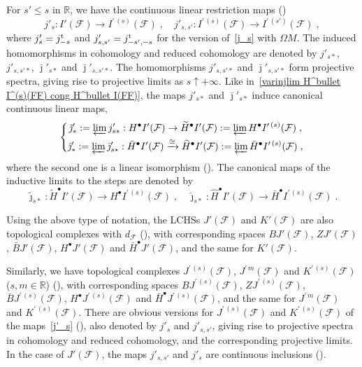 \documentclass{memo-l}
\theoremstyle{plain}
\theoremstyle{definition}
\theoremstyle{remark}
\newcommand{\R}{\mathbb{R}}
\newcommand{\FF}{\mathcal{F}}
\newcommand{\trans}{{\text{\rm t}}}
\numberwithin{section}{chapter}
\numberwithin{equation}{section}%
\begin{document}
For $s'\le s$ in $\R$, we have the continuous linear restriction maps ()
\begin{equation}\label{j'_s}
j'_s:I'(\FF)\to I^{\prime\,(s)}(\FF)\;,\quad j'_{s,s'}:I^{\prime\,(s)}(\FF)\to I^{\prime\,(s')}(\FF)\;,
\end{equation}
where $j'_s=j_{-s}^\trans$ and $j'_{s,s'}=j_{-s',-s}^\trans$ for the version of~\eqref{j_s} with $\Omega M$. The induced homomorphisms in cohomology and reduced cohomology are denoted by  $j'_{s*}$, $j'_{s,s'*}$, $\bar\jmath'_{s*}$ and $\bar\jmath'_{s,s'*}$. The homomorphisms $j'_{s,s'*}$ and $\bar\jmath'_{s,s'*}$ form projective spectra, giving rise to projective limits as $s\uparrow+\infty$. Like in~\eqref{varinjlim H^bullet I^(s)(FF) cong H^bullet I(FF)}, the maps $j'_{s*}$ and $\bar\jmath'_{s*}$ induce canonical continuous linear maps,
\begin{equation}\label{bar H^bullet I'(FF) cong projlim bar H^bullet I^(prime s)(FF)}
\left\{
\begin{gathered}
\tilde\jmath'_*:=\varprojlim j'_{s*}:H^\bullet I'(\FF)\to\widetilde H^\bullet I'(\FF)
:=\varprojlim H^\bullet I^{\prime\,(s)}(\FF)\;,\\
\hat\jmath'_*:=\varprojlim\bar\jmath'_{s*}:\bar H^\bullet I'(\FF)\xrightarrow{\cong}
\widehat H^\bullet I'(\FF):=\varprojlim\bar H^\bullet I^{\prime\,(s)}(\FF)\;,
\end{gathered}
\right.
\end{equation}
where the second one is a linear isomorphism (). The canonical maps of the inductive limits to the steps are denoted by  
\[
\tilde\jmath_{s*}:\widetilde H^\bullet I'(\FF)\to H^\bullet I^{\prime\,(s)}(\FF)\;,\quad
\hat\jmath_{s*}:\widehat H^\bullet I'(\FF)\to\bar H^\bullet I^{\prime\,(s)}(\FF)\;.
\]

Using the above type of notation, the LCHSs $J'(\FF)$ and $K'(\FF)$ are also topological complexes with $d_\FF$ (), with corresponding spaces $BJ'(\FF)$, $ZJ'(\FF)$, $\bar BJ'(\FF)$, $H^\bullet J'(\FF)$\index{$H^\bullet J'(\FF)$} and $\bar H^\bullet J'(\FF)$,\index{$\bar H^\bullet J'(\FF)$} and the same for $K'(\FF)$.\index{$H^\bullet K'(\FF)$}

Similarly, we have topological complexes $J^{\prime\,(s)}(\FF)$, $J^{\prime\,m}(\FF)$ and $K^{\prime\,(s)}(\FF)$ ($s,m\in\R$) (), with corresponding spaces $BJ^{\prime\,(s)}(\FF)$, $ZJ^{\prime\,(s)}(\FF)$, $\bar BJ^{\prime\,(s)}(\FF)$, $H^\bullet J^{\prime\,(s)}(\FF)$ and $\bar H^\bullet J^{\prime\,(s)}(\FF)$, and the same for $J^{\prime\,m}(\FF)$ and $K^{\prime\,(s)}(\FF)$. There are obvious versions for $J^{\prime\,(s)}(\FF)$ and $K^{\prime\,(s)}(\FF)$ of the maps~\eqref{j'_s} (), also denoted by $j'_s$ and $j'_{s,s'}$, giving rise to projective spectra in cohomology and reduced cohomology, and the corresponding projective limits. In the case of $J'(\FF)$, the maps $j'_{s,s'}$ and $j'_s$ are continuous inclusions ().
\end{document}
